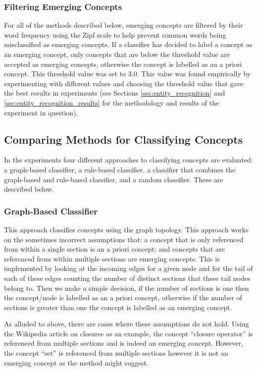 \documentclass[12pt]{article}
\theoremstyle{grammarstyle}
\begin{document}
\subsubsection{Filtering Emerging Concepts}
For all of the methods described below, emerging concepts are filtered by their word frequency using the Zipf scale \citep{brysbaertzipf, van2014subtlex} to help prevent common words being misclassified as emerging concepts.
If a classifier has decided to label a concept as an emerging concept, only concepts that are below the threshold value are accepted as emerging concepts, otherwise the concept is labelled as an a priori concept.
This threshold value was set to 3.0.
This value was found empirically by experimenting with different values and choosing the threshold value that gave the best results in experiments (see Sections \ref{sec:entity_recognition} and  \ref{sec:entity_recognition_results} for the methodology and results of the experiment in question).

\subsection{Comparing Methods for Classifying Concepts}
In the experiments four different approaches to classifying concepts are evaluated: a graph-based classifier, a rule-based classifier, a classifier that combines the graph-based and rule-based classifier, and a random classifier. These are described below.

\subsubsection{Graph-Based Classifier}
This approach classifies concepts using the graph topology. This approach works on the sometimes incorrect assumptions that: a concept that is only referenced from within a single section is an a priori concept; and concepts that are referenced from within multiple sections are emerging concepts. This is implemented by looking at the incoming edges for a given node and for the tail of each of these edges counting the number of distinct sections that these tail nodes belong to. Then we make a simple decision, if the number of sections is one then the concept/node is labelled as an a priori concept, otherwise if the number of sections is greater than one the concept is labelled as an emerging concept.

As alluded to above, there are cases where these assumptions do not hold.
Using the Wikipedia article on closures \citep{wiki:closure} as an example, the concept ``closure operator'' is referenced from multiple sections and is indeed an emerging concept.
However, the concept ``set'' is referenced from multiple sections however it is not an emerging concept as the method might suggest.
\end{document}
